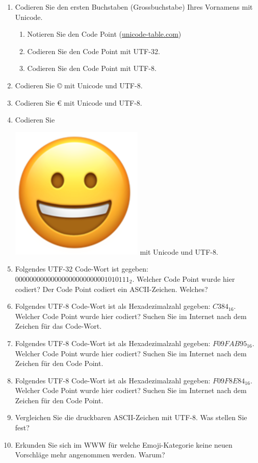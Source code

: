 \begin{enumerate}
\item Codieren Sie den ersten Buchstaben (Grossbuchstabe) Ihres Vornamens mit Unicode.
\begin{enumerate}
\item Notieren Sie den Code Point (\url{unicode-table.com})
\fillwithgrid{0.25in}
\item Codieren Sie den Code Point mit UTF-32.
\fillwithgrid{0.25in}
\item Codieren Sie den Code Point mit UTF-8.
\fillwithgrid{0.25in}
\end{enumerate}
\item Codieren Sie © mit Unicode und UTF-8.
\fillwithgrid{1.5in}
\item Codieren Sie € mit Unicode und UTF-8.
\fillwithgrid{1.5in}
\item Codieren Sie \rule{0pt}{15pt} \includegraphics[scale=0.1]{emoji_grinning_face} mit Unicode und UTF-8.
\fillwithgrid{1.5in}
\item Folgendes UTF-32 Code-Wort ist gegeben: $00000000000000000000000001010111_{2}$. Welcher Code Point wurde hier codiert? Der Code Point codiert ein ASCII-Zeichen. Welches?
\fillwithgrid{1.5in}

\newpage

\item Folgendes UTF-8 Code-Wort ist als Hexadezimalzahl gegeben: $C384_{16}$. Welcher Code Point wurde hier codiert? Suchen Sie im Internet nach dem Zeichen für das Code-Wort.
\fillwithgrid{1.75in}
\item Folgendes UTF-8 Code-Wort ist als Hexadezimalzahl gegeben: $F09FAB95_{16}$. Welcher Code Point wurde hier codiert? Suchen Sie im Internet nach dem Zeichen für den Code Point.
\fillwithgrid{1.75in}
\item Folgendes UTF-8 Code-Wort ist als Hexadezimalzahl gegeben: $F09F8E84_{16}$. Welcher Code Point wurde hier codiert? Suchen Sie im Internet nach dem Zeichen für den Code Point.
\fillwithgrid{1.75in}
\item Vergleichen Sie die druckbaren \ac{ASCII}-Zeichen mit UTF-8. Was stellen Sie fest?
\fillwithgrid{1in}
\item Erkunden Sie sich im \ac{WWW} für welche Emoji-Kategorie keine neuen Vorschläge mehr angenommen werden. Warum?
\end{enumerate}